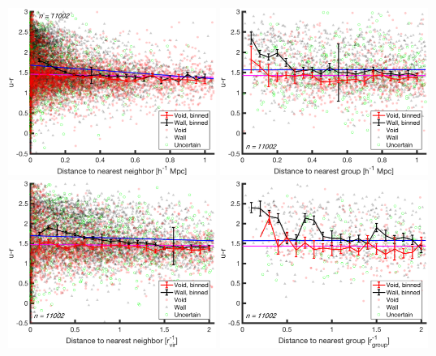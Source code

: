 \begin{figure}
    \includegraphics[width=0.49\textwidth]{Images/smallScaleEnvironment/dwarf_absDist_ur}
    \includegraphics[width=0.49\textwidth]{Images/smallScaleEnvironment/dwarf_groupAbsDist_ur}
    \includegraphics[width=0.49\textwidth]{Images/smallScaleEnvironment/dwarf_virDist_ur}
    \includegraphics[width=0.49\textwidth]{Images/smallScaleEnvironment/dwarf_groupRDist_ur}

\end{figure}
